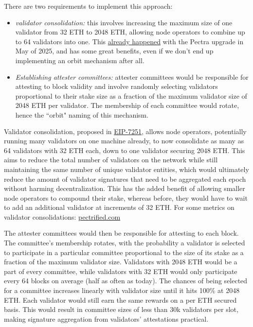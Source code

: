 \documentclass[12pt]{article}
\begin{document}
There are two requirements to implement this approach: 

\begin{itemize}
    \item \textit{validator consolidation:} this involves increasing the maximum size of one validator from 32 ETH to 2048 ETH, allowing node operators to combine up to 64 validators into one. This \href{https://consensys.io/blog/ethereum-pectra-upgrade#:~:text=EIP\%2D7251\%3A\%20Increase\%20the\%20MAX_EFFECTIVE_BALANCE}{already happened} with the Pectra upgrade in May of 2025, and has some great benefits, even if we don't end up implementing an orbit mechanism after all. 
    \item \textit{Establishing attester committees:} attester committees would be responsible for attesting to block validity and involve randomly selecting validators proportional to their stake size as a fraction of the maximum validator size of 2048 ETH per validator. The membership of each committee would rotate, hence the ``orbit" naming of this mechanism. 
\end{itemize}

Validator consolidation, proposed in \href{https://eips.ethereum.org/EIPS/eip-7251}{EIP-7251}, allows node operators, potentially running many validators on one machine already, to now consolidate as many as 64 validators with 32 ETH each, down to one validator securing 2048 ETH.  This aims to reduce the total number of validators on the network while still maintaining the same number of unique validator entities, which would ultimately reduce the amount of validator signatures that need to be aggregated each epoch without harming decentralization. This has the added benefit of allowing smaller node operators to compound their stake, whereas before, they would have to wait to add an additional validator at increments of 32 ETH. For some metrics on validator consolidations: \href{https://pectrified.com/mainnet}{pectrified.com}

The attester committees would then be responsible for attesting to each block. The committee's membership rotates, with the probability a validator is selected to participate in a particular committee proportional to the size of its stake as a fraction of the maximum validator size. Validators with 2048 ETH would be a part of every committee, while validators with 32 ETH would only participate every 64 blocks on average (half as often as today). The chances of being selected for a committee increases linearly with validator size until it hits 100\% at 2048 ETH. Each validator would still earn the same rewards on a per ETH secured basis.  This would result in committee sizes of less than 30k validators per slot, making signature aggregation from validators' attestations practical. 
\end{document}
